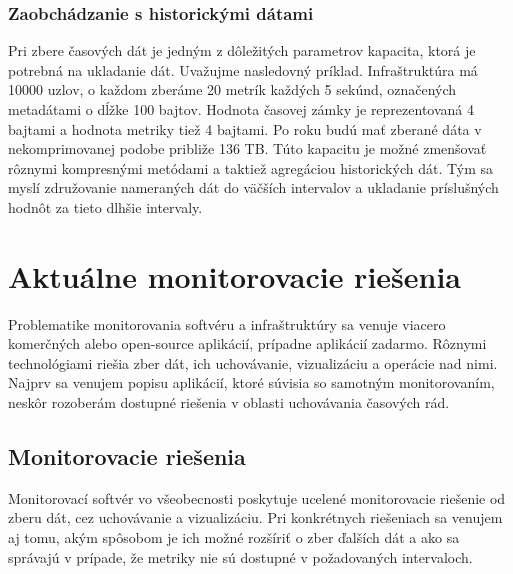 \documentclass[12pt,twoside,color,cover,table]{fithesis3}
\begin{document}
\subsection{Zaobchádzanie s historickými dátami}
\label{sec:example}
Pri zbere časových dát je jedným z dôležitých parametrov kapacita, ktorá je potrebná na ukladanie dát. Uvažujme nasledovný príklad. Infraštruktúra má 10000 uzlov, o každom zberáme 20 metrík každých 5 sekúnd,
označených metadátami o dĺžke 100 bajtov. Hodnota časovej zámky je reprezentovaná 4 bajtami a hodnota metriky tiež 4 bajtami. Po roku budú mať zberané dáta v nekomprimovanej podobe približe 136 TB. Túto kapacitu
je možné zmenšovať rôznymi kompresnými metódami a taktiež agregáciou historických dát. Tým sa myslí združovanie nameraných dát do väčších intervalov a ukladanie príslušných hodnôt za tieto dlhšie intervaly.

\chapter{Aktuálne monitorovacie riešenia}
Problematike monitorovania softvéru a infraštruktúry sa venuje viacero komerčných alebo open-source aplikácií, prípadne aplikácií zadarmo. Rôznymi technológiami riešia zber dát, ich uchovávanie, vizualizáciu a operácie nad
nimi. Najprv sa venujem popisu aplikácií, ktoré súvisia so samotným monitorovaním, neskôr rozoberám dostupné riešenia v oblasti uchovávania časových rád.

\section{Monitorovacie riešenia}
Monitorovací softvér vo všeobecnosti poskytuje ucelené monitorovacie riešenie od zberu dát, cez uchovávanie a vizualizáciu. Pri konkrétnych riešeniach sa venujem aj tomu, akým spôsobom je ich možné
rozšíriť o zber ďalších dát a ako sa správajú v prípade, že metriky nie sú dostupné v požadovaných intervaloch.
\end{document}
